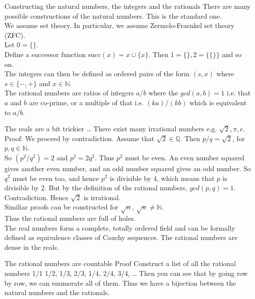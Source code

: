 \documentclass{beamer}
\begin{document}
\begin{frame}{Constructing the natural numbers, the integers and the rationals}
There are many possible constructions of the natural numbers. This is the standard one.\\
We assume set theory. In particular, we assume Zermelo-Fraenkel set theory (ZFC).\\
Let $0 = \{\}$. \\
Define a successor function $\text{succ}{(x)} = x \cup \{ x \}$. 
Then $1 = \{\}, 2 = \{\{\}\}$ and so on.\\
The integers can then be defined as ordered pairs of the form $(s, x)$ where $s \in \{-, +\}$ and
$x \in \mathbb{N}$. \\
The rational numbers are ratios of integers $a / b$ where the $gcd(a, b) = 1$ i.e. that $a$ and $b$ are
co-prime, or a multiple of that i.e. $(k a) / (k b)$ which is equivalent to $a / b$.
\end{frame}

\begin{frame}{The reals are a bit trickier \ldots}
There exist many irrational numbers e.g. $\sqrt{2}, \pi, e$. \\
Proof:
We proceed by contradiction. Assume that $\sqrt{2} \in \mathbb{Q}$. Then $p / q = \sqrt{2}$, for $p, q \in \mathbb{N}$. \\
So $(p^2 / q^2) = 2$ and $p^2 = 2 q^2$. Thus $p^2$ must be even. An even number squared gives
another even number, and an odd number squared gives an odd number. So $q^2$ must be even too, and
hence $p^2$ is divisible by 4, which means that $p$ is divisible by 2. But by the definition of the 
rational numbers, $gcd(p, q) = 1$. Contradiction. Hence $\sqrt{2}$ is irrational.\\
Similiar proofs can be constructed for $\sqrt{n}$, $\sqrt{n} \ne \mathbb{N}$. \\
Thus the rational numbers are full of holes. \\
The real numbers form a complete, totally ordered field and can be formally defined as equivalence classes of
Cauchy sequences. The rational numbers are dense in the reals.
\end{frame}

\begin{frame}{The rational numbers are countable}
Proof
Construct a list of all the rational numbers
1/1
1/2,
1/3, 2/3,
1/4, 2/4, 3/4,
\ldots
Then you can see that by going row by row, we can enumerate all of them. Thus we have a bijection between the
natural numbers and the rationals.
\end{frame}
\end{document}
